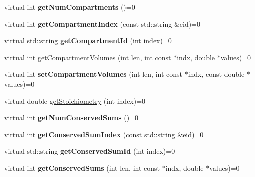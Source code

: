 \begin{DoxyCompactItemize}
\item 
\hypertarget{classrr_1_1_executable_model_acada1e982eafe06d0d5e46defdb40ca7}{virtual int {\bfseries get\-Num\-Compartments} ()=0}\label{classrr_1_1_executable_model_acada1e982eafe06d0d5e46defdb40ca7}

\item 
\hypertarget{classrr_1_1_executable_model_a366727be244766db2ff917b64949858c}{virtual int {\bfseries get\-Compartment\-Index} (const std\-::string \&eid)=0}\label{classrr_1_1_executable_model_a366727be244766db2ff917b64949858c}

\item 
\hypertarget{classrr_1_1_executable_model_a7b797c260c619f03761063f1863af2df}{virtual std\-::string {\bfseries get\-Compartment\-Id} (int index)=0}\label{classrr_1_1_executable_model_a7b797c260c619f03761063f1863af2df}

\item 
virtual int \hyperlink{classrr_1_1_executable_model_a1fe9ea6daf187a2a2dc83074c35d05ed}{get\-Compartment\-Volumes} (int len, int const $\ast$indx, double $\ast$values)=0
\item 
\hypertarget{classrr_1_1_executable_model_ae3b2f7000f709a92f78dbe78adfc992b}{virtual int {\bfseries set\-Compartment\-Volumes} (int len, int const $\ast$indx, const double $\ast$values)=0}\label{classrr_1_1_executable_model_ae3b2f7000f709a92f78dbe78adfc992b}

\item 
virtual double \hyperlink{classrr_1_1_executable_model_a24c46805c8c790f1cbec5c7726f03aa6}{get\-Stoichiometry} (int index)=0
\item 
\hypertarget{classrr_1_1_executable_model_ab1d58cc9a6bfd38851a3f42e08aa5a96}{virtual int {\bfseries get\-Num\-Conserved\-Sums} ()=0}\label{classrr_1_1_executable_model_ab1d58cc9a6bfd38851a3f42e08aa5a96}

\item 
\hypertarget{classrr_1_1_executable_model_af877de56a87fb2f2c1f13040d65d5518}{virtual int {\bfseries get\-Conserved\-Sum\-Index} (const std\-::string \&eid)=0}\label{classrr_1_1_executable_model_af877de56a87fb2f2c1f13040d65d5518}

\item 
\hypertarget{classrr_1_1_executable_model_a0bb2f514a22eb7e19928a74314435c98}{virtual std\-::string {\bfseries get\-Conserved\-Sum\-Id} (int index)=0}\label{classrr_1_1_executable_model_a0bb2f514a22eb7e19928a74314435c98}

\item 
\hypertarget{classrr_1_1_executable_model_ac083135eed08fa60a6351af41aaecde2}{virtual int {\bfseries get\-Conserved\-Sums} (int len, int const $\ast$indx, double $\ast$values)=0}\label{classrr_1_1_executable_model_ac083135eed08fa60a6351af41aaecde2}


\end{DoxyCompactItemize}
